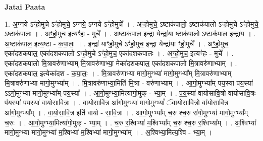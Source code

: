 \documentclass[17pt]{extarticle}
\begin{document}
\textbf{Jatai Paata} \newline

1. अ॒ग्नये ऽꣳ॑हो॒मुचे ऽꣳ॑हो॒मुचे॒ ऽग्नये॒ ऽग्नये ऽꣳ॑हो॒मुचे᳚ । . अꣳ॒॒हो॒मुचे॒ ऽष्टाक॑पालो॒ ऽष्टाक॑पालो ऽꣳहो॒मुचे ऽꣳ॑हो॒मुचे॒ ऽष्टाक॑पालः । . अꣳ॒॒हो॒मुच॒ इत्यꣳ॑हः - मुचे᳚ । . अ॒ष्टाक॑पाल॒ इन्द्रा॒ येन्द्रा॑या॒ ष्टाक॑पालो॒ ऽष्टाक॑पाल॒ इन्द्रा॑य । . अ॒ष्टाक॑पाल॒ इत्य॒ष्टा - क॒पा॒लः॒ । . इन्द्रा॑ याꣳहो॒मुचे ऽꣳ॑हो॒मुच॒ इन्द्रा॒ येन्द्रा॑या ꣳहो॒मुचे᳚ । . अꣳ॒॒हो॒मुच॒ एका॑दशकपाल॒ एका॑दशकपालो ऽꣳहो॒मुचे ऽꣳ॑हो॒मुच॒ एका॑दशकपालः । . अꣳ॒॒हो॒मुच॒ इत्यꣳ॑हः - मुचे᳚ । . एका॑दशकपालो मि॒त्रावरु॑णाभ्याम् मि॒त्रावरु॑णाभ्या॒ मेका॑दशकपाल॒ एका॑दशकपालो मि॒त्रावरु॑णाभ्याम् । . एका॑दशकपाल॒ इत्येका॑दश - क॒पा॒लः॒ । . मि॒त्रावरु॑णाभ्या मागो॒मुग्भ्या॑ मागो॒मुग्भ्या᳚म् मि॒त्रावरु॑णाभ्याम् मि॒त्रावरु॑णाभ्या मागो॒मुग्भ्या᳚म् । . मि॒त्रावरु॑णाभ्या॒मिति॑ मि॒त्रा - वरु॑णाभ्याम् । . आ॒गो॒मुग्भ्या᳚म् पय॒स्या॑ पय॒स्या॑ ऽऽगो॒मुग्भ्या॑ मागो॒मुग्भ्या᳚म् पय॒स्या᳚ । . आ॒गो॒मुग्भ्या॒मित्या॑गो॒मुक् - भ्या॒म् । . प॒य॒स्या॑ वायोसावि॒त्रो वा॑योसावि॒त्रः प॑य॒स्या॑ पय॒स्या॑ वायोसावि॒त्रः । . वा॒यो॒सा॒वि॒त्र आ॑गो॒मुग्भ्या॑ मागो॒मुग्भ्यां᳚ ॅवायोसावि॒त्रो वा॑योसावि॒त्र आ॑गो॒मुग्भ्या᳚म् । . वा॒यो॒सा॒वि॒त्र इति॑ वायो - सा॒वि॒त्रः । . आ॒गो॒मुग्भ्या᳚म् च॒रु श्च॒रु रा॑गो॒मुग्भ्या॑ मागो॒मुग्भ्या᳚म् च॒रुः । . आ॒गो॒मुग्भ्या॒मित्या॑गो॒मुक् - भ्या॒म् । . च॒रु र॒श्विभ्या॑ म॒श्विभ्या᳚म् च॒रु श्च॒रु र॒श्विभ्या᳚म् । . अ॒श्विभ्या॑ मागो॒मुग्भ्या॑ मागो॒मुग्भ्या॑ म॒श्विभ्या॑ म॒श्विभ्या॑ मागो॒मुग्भ्या᳚म् । . अ॒श्विभ्या॒मित्य॒श्वि - भ्या॒म् । \newline
\end{document}
